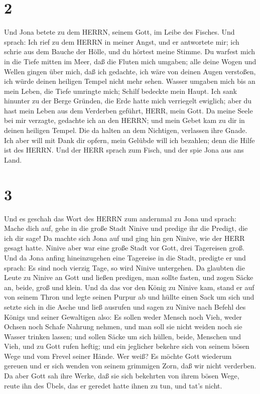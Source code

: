 \hypertarget{section-1}{%
\section{2}\label{section-1}}

 Und Jona betete zu dem HERRN, seinem Gott, im Leibe des
Fisches.  Und sprach: Ich rief zu dem HERRN in meiner Angst,
und er antwortete mir; ich schrie aus dem Bauche der Hölle, und du
hörtest meine Stimme.  Du warfest mich in die Tiefe mitten
im Meer, daß die Fluten mich umgaben; alle deine Wogen und Wellen gingen
über mich,  daß ich gedachte, ich wäre von deinen Augen
verstoßen, ich würde deinen heiligen Tempel nicht mehr sehen.
 Wasser umgaben mich bis an mein Leben, die Tiefe umringte
mich; Schilf bedeckte mein Haupt.  Ich sank hinunter zu der
Berge Gründen, die Erde hatte mich verriegelt ewiglich; aber du hast
mein Leben aus dem Verderben geführt, HERR, mein Gott.  Da
meine Seele bei mir verzagte, gedachte ich an den HERRN; und mein Gebet
kam zu dir in deinen heiligen Tempel.  Die da halten an dem
Nichtigen, verlassen ihre Gnade.  Ich aber will mit Dank dir
opfern, mein Gelübde will ich bezahlen; denn die Hilfe ist des HERRN.
 Und der HERR sprach zum Fisch, und der spie Jona aus ans
Land.

\hypertarget{section-2}{%
\section{3}\label{section-2}}

 Und es geschah das Wort des HERRN zum andernmal zu Jona und
sprach:  Mache dich auf, gehe in die große Stadt Ninive und
predige ihr die Predigt, die ich dir sage!  Da machte sich
Jona auf und ging hin gen Ninive, wie der HERR gesagt hatte. Ninive aber
war eine große Stadt vor Gott, drei Tagereisen groß.  Und da
Jona anfing hineinzugehen eine Tagereise in die Stadt, predigte er und
sprach: Es sind noch vierzig Tage, so wird Ninive untergehen.
 Da glaubten die Leute zu Ninive an Gott und ließen
predigen, man sollte fasten, und zogen Säcke an, beide, groß und klein.
 Und da das vor den König zu Ninive kam, stand er auf von
seinem Thron und legte seinen Purpur ab und hüllte einen Sack um sich
und setzte sich in die Asche  und ließ ausrufen und sagen zu
Ninive nach Befehl des Königs und seiner Gewaltigen also: Es sollen
weder Mensch noch Vieh, weder Ochsen noch Schafe Nahrung nehmen, und man
soll sie nicht weiden noch sie Wasser trinken lassen;  und
sollen Säcke um sich hüllen, beide, Menschen und Vieh, und zu Gott rufen
heftig; und ein jeglicher bekehre sich von seinem bösen Wege und vom
Frevel seiner Hände.  Wer weiß? Es möchte Gott wiederum
gereuen und er sich wenden von seinem grimmigen Zorn, daß wir nicht
verderben.  Da aber Gott sah ihre Werke, daß sie sich
bekehrten von ihrem bösen Wege, reute ihn des Übels, das er geredet
hatte ihnen zu tun, und tat's nicht.

